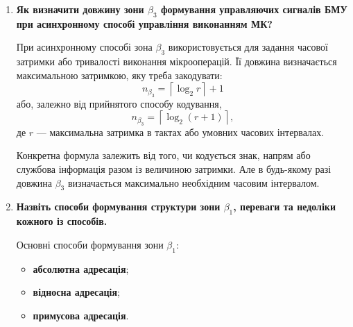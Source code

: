 \documentclass[12pt,a4paper]{article}
\begin{document}
\begin{enumerate}
        \textbf{Вертикальний спосіб:}
        у зоні записується код операції, який потім дешифрується.
        \begin{itemize}
            \item переваги: коротша довжина мікрокоманди;
            \item недоліки: потрібні дешифратори, менша швидкодія, обмеження на паралельність мікрооперацій.
        \end{itemize}

        \textbf{Змішаний спосіб:}
        частина сигналів кодується горизонтально, частина --- вертикально.
        \begin{itemize}
            \item переваги: компроміс між довжиною слова та швидкодією;
            \item недоліки: складніша організація структури мікрокоманди.
        \end{itemize}

        \item \textbf{Як визначити довжину зони $\beta_3$ формування управляючих сигналів БМУ при асинхронному способі управління виконанням МК?}

        При асинхронному способі зона $\beta_3$ використовується для задання часової затримки або тривалості виконання мікрооперацій. Її довжина визначається максимальною затримкою, яку треба закодувати:
        \[
            n_{\beta_3} = \left\lceil \log_2 r \right\rceil + 1
        \]
        або, залежно від прийнятого способу кодування,
        \[
            n_{\beta_3} = \left\lceil \log_2 (r+1) \right\rceil,
        \]
        де $r$ --- максимальна затримка в тактах або умовних часових інтервалах.

        Конкретна формула залежить від того, чи кодується знак, напрям або службова інформація разом із величиною затримки. Але в будь-якому разі довжина $\beta_3$ визначається максимально необхідним часовим інтервалом.

        \item \textbf{Назвіть способи формування структури зони $\beta_1$, переваги та недоліки кожного із способів.}

        Основні способи формування зони $\beta_1$:
        \begin{itemize}
            \item \textbf{абсолютна адресація};
            \item \textbf{відносна адресація};
            \item \textbf{примусова адресація}.
        \end{itemize}


\end{enumerate}
\end{document}
